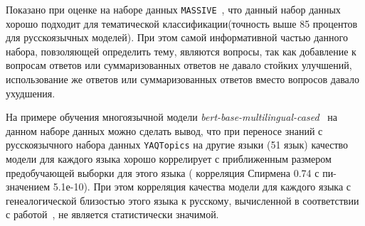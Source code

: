 \begin{table}[t]
\centering
{}
\caption{Размеры набора данных \texttt{YAQTopics} по классу и разбиению}
\label{tab:rutopics:sizes2}
\end{table}


Показано при оценке на наборе данных \texttt{MASSIVE}~\cite{massive}, что данный набор данных хорошо подходит для тематической классификации(точность выше 85 процентов для русскоязычных моделей). При этом самой информативной частью данного набора, повзоляющей определить тему, являются вопросы, так как добавление к вопросам ответов или суммаризованных ответов не давало стойких улучшений, использование же ответов или суммаризованных ответов вместо вопросов давало ухудшения.



На примере обучения многоязычной модели \textit{bert-base-multilingual-cased}~\cite{devlin_2018} на данном наборе данных можно сделать вывод, что при переносе знаний с русскоязычного набора данных \texttt{YAQTopics} на другие языки (51 язык) качество модели для каждого языка хорошо коррелирует с приближенным размером предобучающей выборки для этого языка ( корреляция Спирмена 0.74 с пи-значением 5.1е-10). При этом корреляция качества модели для каждого языка с генеалогической близостью этого языка к русскому, вычисленной в соответствии с работой~\cite{langsim}, не является статистически значимой.

